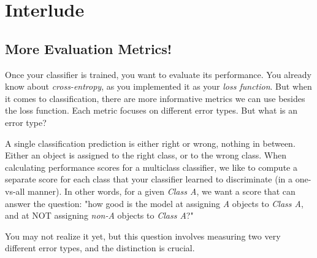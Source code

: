 
\section*{Interlude}
\subsection*{More Evaluation Metrics!}
Once your classifier is trained, you want to evaluate its performance.
You already know about \textit{cross-entropy}, as you implemented it as your \textit{loss function}.
But when it comes to classification, there are more informative metrics we can use besides the loss function.
Each metric focuses on different error types.  
But what is an error type?
 
A single classification prediction is either right or wrong, nothing in between.
Either an object is assigned to the right class, or to the wrong class.
When calculating performance scores for a multiclass classifier, we like to compute a separate score for each class that your classifier learned to discriminate (in a one-vs-all manner).
In other words, for a given \textit{Class A}, we want a score that can answer the question: "how good is the model at assigning \textit{A} objects to \textit{Class A}, and at NOT assigning \textit{non-A} objects to \textit{Class A}?"  

You may not realize it yet, but this question involves measuring two very different error types, and the distinction is crucial.
\newpage
